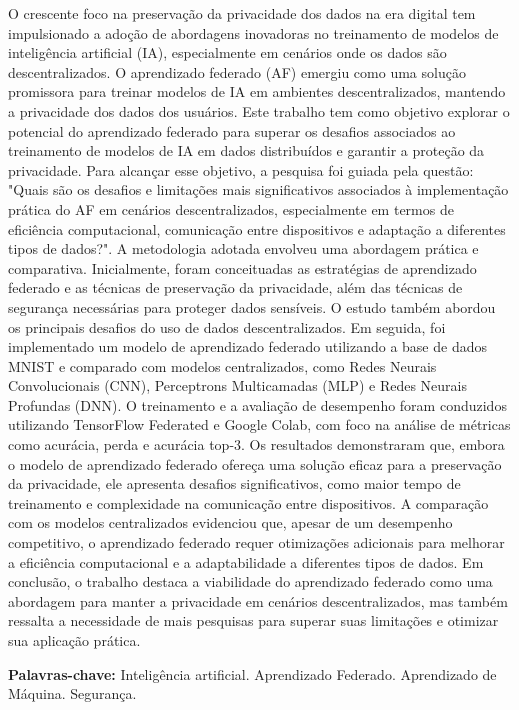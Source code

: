 \begin{resumo}

O crescente foco na preservação da privacidade dos dados na era digital tem impulsionado a adoção de abordagens inovadoras no treinamento de modelos de inteligência artificial (IA), especialmente em cenários onde os dados são descentralizados. O aprendizado federado (AF) emergiu como uma solução promissora para treinar modelos de IA em ambientes descentralizados, mantendo a privacidade dos dados dos usuários. Este trabalho tem como objetivo explorar o potencial do aprendizado federado para superar os desafios associados ao treinamento de modelos de IA em dados distribuídos e garantir a proteção da privacidade. Para alcançar esse objetivo, a pesquisa foi guiada pela questão: "Quais são os desafios e limitações mais significativos associados à implementação prática do AF em cenários descentralizados, especialmente em termos de eficiência computacional, comunicação entre dispositivos e adaptação a diferentes tipos de dados?". A metodologia adotada envolveu uma abordagem prática e comparativa. Inicialmente, foram conceituadas as estratégias de aprendizado federado e as técnicas de preservação da privacidade, além das técnicas de segurança necessárias para proteger dados sensíveis. O estudo também abordou os principais desafios do uso de dados descentralizados. Em seguida, foi implementado um modelo de aprendizado federado utilizando a base de dados MNIST e comparado com modelos centralizados, como Redes Neurais Convolucionais (CNN), Perceptrons Multicamadas (MLP) e Redes Neurais Profundas (DNN). O treinamento e a avaliação de desempenho foram conduzidos utilizando TensorFlow Federated e Google Colab, com foco na análise de métricas como acurácia, perda e acurácia top-3. Os resultados demonstraram que, embora o modelo de aprendizado federado ofereça uma solução eficaz para a preservação da privacidade, ele apresenta desafios significativos, como maior tempo de treinamento e complexidade na comunicação entre dispositivos. A comparação com os modelos centralizados evidenciou que, apesar de um desempenho competitivo, o aprendizado federado requer otimizações adicionais para melhorar a eficiência computacional e a adaptabilidade a diferentes tipos de dados. Em conclusão, o trabalho destaca a viabilidade do aprendizado federado como uma abordagem para manter a privacidade em cenários descentralizados, mas também ressalta a necessidade de mais pesquisas para superar suas limitações e otimizar sua aplicação prática.

\vspace{\onelineskip}
    
\noindent
\textbf{Palavras-chave:} Inteligência artificial. Aprendizado Federado. Aprendizado de Máquina. Segurança. 
\end{resumo}